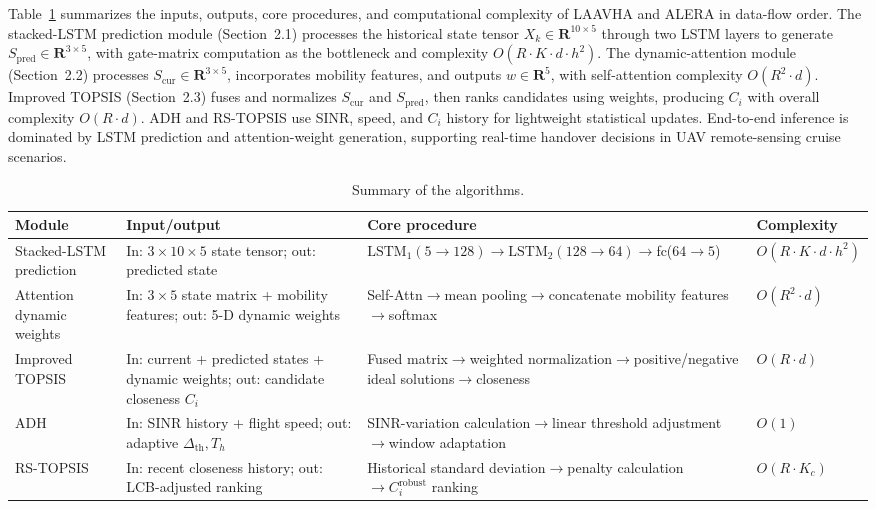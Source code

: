 \documentclass[10pt,a4paper]{article}
\begin{document}
Table~\ref{tab:complexity} summarizes the inputs, outputs, core procedures, and computational complexity of LAAVHA and ALERA in data-flow order. The stacked-LSTM prediction module (Section~2.1) processes the historical state tensor $X_k\in\mathbf{R}^{10\times5}$ through two LSTM layers to generate $S_{\mathrm{pred}}\in\mathbf{R}^{3\times5}$, with gate-matrix computation as the bottleneck and complexity $O(R\cdot K\cdot d\cdot h^2)$. The dynamic-attention module (Section~2.2) processes $S_{\mathrm{cur}}\in\mathbf{R}^{3\times5}$, incorporates mobility features, and outputs $w\in\mathbf{R}^5$, with self-attention complexity $O(R^2\cdot d)$. Improved TOPSIS (Section~2.3) fuses and normalizes $S_{\mathrm{cur}}$ and $S_{\mathrm{pred}}$, then ranks candidates using weights, producing $C_i$ with overall complexity $O(R\cdot d)$. ADH and RS-TOPSIS use SINR, speed, and $C_i$ history for lightweight statistical updates. End-to-end inference is dominated by LSTM prediction and attention-weight generation, supporting real-time handover decisions in UAV remote-sensing cruise scenarios.

\begin{table}[H]
\centering
\caption{Summary of the algorithms.}
\small
\begin{tabular}{p{2.7cm}p{3.0cm}p{4.4cm}p{2.2cm}}
\toprule
Module & Input/output & Core procedure & Complexity \\
\midrule
Stacked-LSTM prediction & In: $3\times10\times5$ state tensor; out: predicted state & $\mathrm{LSTM}_1(5\rightarrow128)\rightarrow\mathrm{LSTM}_2(128\rightarrow64)\rightarrow$fc($64\rightarrow5$) & $O(R\cdot K\cdot d\cdot h^2)$ \\
Attention dynamic weights & In: $3\times5$ state matrix + mobility features; out: 5-D dynamic weights & Self-Attn$\rightarrow$mean pooling$\rightarrow$concatenate mobility features$\rightarrow$softmax & $O(R^2\cdot d)$ \\
Improved TOPSIS & In: current + predicted states + dynamic weights; out: candidate closeness $C_i$ & Fused matrix$\rightarrow$weighted normalization$\rightarrow$positive/negative ideal solutions$\rightarrow$closeness & $O(R\cdot d)$ \\
ADH & In: SINR history + flight speed; out: adaptive $\Delta_{\mathrm{th}},T_h$ & SINR-variation calculation$\rightarrow$linear threshold adjustment$\rightarrow$window adaptation & $O(1)$ \\
RS-TOPSIS & In: recent closeness history; out: LCB-adjusted ranking & Historical standard deviation$\rightarrow$penalty calculation$\rightarrow C_i^{\mathrm{robust}}$ ranking & $O(R\cdot K_c)$ \\
\bottomrule
\end{tabular}
\label{tab:complexity}
\end{table}
\end{document}
